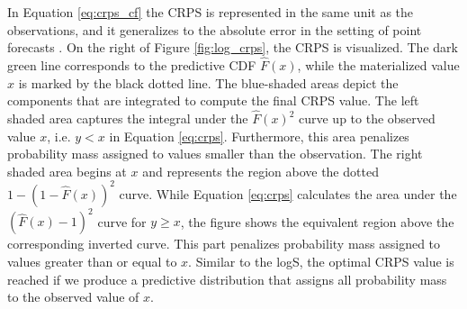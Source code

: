 \documentclass[a4paper,oneside,bibliography=totoc]{scrbook}
\begin{document}
In Equation \ref{eq:crps_cf} the CRPS is represented in the same unit as the observations, and it generalizes to the absolute error in the setting of point forecasts \cite{gneiting_probabilistic_2014}. 
% 
On the right of Figure \ref{fig:log_crps}, the CRPS is visualized. 
The dark green line corresponds to the predictive CDF $\hat{F}(x)$, while the materialized value $x$ is marked by the black dotted line.
The blue-shaded areas depict the components that are integrated to compute the final CRPS value.
The left shaded area captures the integral under the $\hat{F}(x)^2$ curve up to the observed value $x$, i.e. $y<x$ in Equation \ref{eq:crps}.
Furthermore, this area penalizes probability mass assigned to values smaller than the observation.
The right shaded area begins at $x$ and represents the region above the dotted $1-(1-\hat{F}(x))^2$ curve. While Equation \ref{eq:crps} calculates the area under the $(\hat{F}(x)-1)^2$ curve for $y\geq x$, the figure shows the equivalent region above the corresponding inverted curve.
This part penalizes probability mass assigned to values greater than or equal to $x$.
Similar to the logS, the optimal CRPS value is reached if we produce a predictive distribution that assigns all probability mass to the observed value of $x$.
\newline
\end{document}
